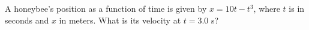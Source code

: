  A honeybee's position as a function of time is given by
$x=10t-t^3$, where $t$ is in seconds and $x$ in meters.  What
is its velocity at $t=3.0$ s?
\answercheck
